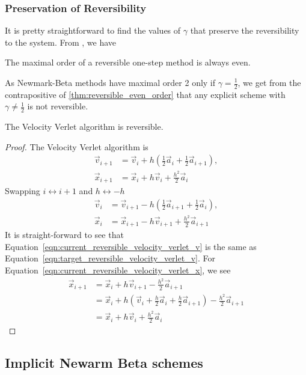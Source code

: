 \documentclass[../Main.tex]{subfiles}
\begin{document}
\subsubsection{Preservation of Reversibility}
It is pretty straightforward to find the values of $\gamma$ that preserve the reversibility to the system. From \cite{Paganini2017}, we have
\begin{theorem}The maximal order of a reversible one-step method is always even. \label{thm:reversible_even_order} \end{theorem}
 As Newmark-Beta methods have maximal order 2 only if $\gamma = \frac{1}{2}$, we get from the contrapositive of \ref{thm:reversible_even_order} that any explicit scheme with $\gamma \neq \frac{1}{2}$ is not reversible.
\begin{claim} The Velocity Verlet algorithm is reversible. \end{claim}
\begin{proof}
The Velocity Verlet algorithm is
\begin{align}
		\vec{v}_{i+1} & = \vec{v}_{i} + h\left(\frac{1}{2}\vec{a}_{i} + \frac{1}{2}\vec{a}_{i+1}\right), \label{eqn:target_reversible_velocity_verlet_v}\\
		\vec{x}_{i+1} & = \vec{x}_{i} + h\vec{v}_{i} + \frac{h^2}{2}\vec{a}_{i} \label{eqn:target_reversible_velocity_verlet_x} 
\end{align}
Swapping $i \leftrightarrow i+1$ and $h \leftrightarrow -h$
\begin{align}
		\vec{v}_{i} & = \vec{v}_{i+1} - h\left(\frac{1}{2}\vec{a}_{i+1} + \frac{1}{2}\vec{a}_{i}\right),  \label{eqn:current_reversible_velocity_verlet_v}\\
		\vec{x}_{i} & = \vec{x}_{i+1} - h\vec{v}_{i+1} + \frac{h^2}{2}\vec{a}_{i+1} \label{eqn:current_reversible_velocity_verlet_x} 
\end{align}
It is straight-forward to see that Equation~\ref{eqn:current_reversible_velocity_verlet_v} is the same as Equation~\ref{eqn:target_reversible_velocity_verlet_v}.
For Equation~\ref{eqn:current_reversible_velocity_verlet_x}, we see
\begin{align*}
	\vec{x}_{i+1} & = \vec{x}_{i} + h\vec{v}_{i+1} - \frac{h^2}{2}\vec{a}_{i+1} \\
	& = \vec{x}_{i} + h\left(\vec{v}_{i} + \frac{h}{2}\vec{a}_{i} + \frac{h}{2}\vec{a}_{i+1}\right) - \frac{h^2}{2}\vec{a}_{i+1} \\
	& = \vec{x}_{i} + h\vec{v}_{i} + \frac{h^2}{2}\vec{a}_{i}
\end{align*} 
\end{proof} 


\subsection{Implicit Newarm Beta schemes}
\end{document}
